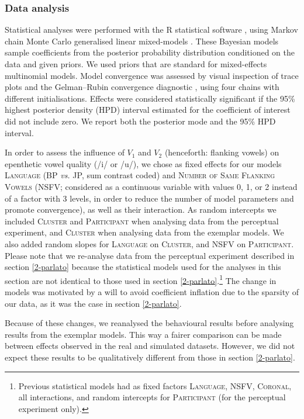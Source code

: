 \subsubsection{Data analysis}
Statistical analyses were performed with the R statistical software \cite{R-base}, using Markov chain Monte Carlo generalised linear mixed-models \cite{R-MCMCglmm, R-coda}. These Bayesian models sample coefficients from the posterior probability distribution conditioned on the data and given priors. We used priors that are standard for mixed-effects multinomial models. Model convergence was assessed by visual inspection of trace plots and the Gelman–Rubin convergence diagnostic \cite{gelman1992}, using four chains with different initialisations. Effects were considered statistically significant if the 95\% highest posterior density (HPD) interval estimated for the coefficient of interest did not include zero. We report both the posterior mode and the 95\% HPD interval.  

In order to assess the influence of $V_{1}$ and $V_{2}$ (henceforth: flanking vowels) on epenthetic vowel quality (/i/ or /u/), we chose as fixed effects for our models \textsc{Language} (BP \textit{vs.} JP, sum contrast coded) and \textsc{Number of Same Flanking Vowels} (\textsc{NSFV}; considered as a continuous variable with values 0, 1, or 2 instead of a factor with 3 levels, in order to reduce the number of model parameters and promote convergence), as well as their interaction. As random intercepts we included \textsc{Cluster} and \textsc{Participant} when analysing data from the perceptual experiment, and \textsc{Cluster} when analysing data from the exemplar models. We also added random slopes for \textsc{Language} on \textsc{Cluster}, and \textsc{NSFV} on \textsc{Participant}. Please note that we re-analyse data from the perceptual experiment described in section \ref{2-parlato} because the statistical models used for the analyses in this section are not identical to those used in section \ref{2-parlato}.\footnote{Previous statistical models had as fixed factors \textsc{Language}, \textsc{NSFV}, \textsc{Coronal}, all interactions, and random intercepts for \textsc{Participant} (for the perceptual experiment only).} The change in models was motivated by a will to avoid coefficient inflation due to the sparsity of our data, as it was the case in section \ref{2-parlato}.

Because of these changes, we reanalysed the behavioural results before analysing results from the exemplar models. This way a fairer comparison can be made between effects observed in the real and simulated datasets. However, we did not expect these results to be qualitatively different from those in section \ref{2-parlato}.   


